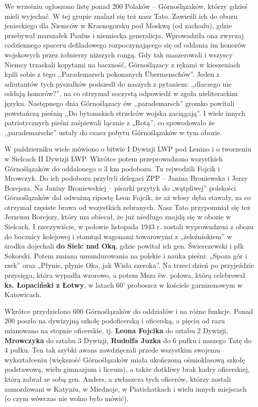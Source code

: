 We wrześniu ogłoszono listę ponad 200 Polaków -- Górnoślązaków, którzy gdzieś mieli wyjechać. W tej grupie znalazł się też nasz Tato. Zawieźli ich do obozu jenieckiego dla Niemców w Krasnogorsku pod Moskwą (od zachodu), gdzie przebywał marszałek Paulus i  niemiecka generalicja. Wprowadziła ona zwyczaj codziennego spaceru defiladowego rozpoczynającego się od oddania im honorów wojskowych przez żołnierzy niższych rangą. Gdy tak maszerowali i wszyscy Niemcy trzaskali kopytami na baczność, Górnoślązacy z rękami w kieszeniach kpili sobie z tego ,,Parademarsch pokonanych Übermenschów''. Jeden z adiutantów tych pyszałków podszedł do naszych z pytaniem: ,,dlaczego nie oddają honorów?'', na co otrzymał soczystą odpowiedź w zgoła nieliterackim języku. Następnego dnia Górnoślązacy ów ,,parademarsch'' gromko powitali powstańczą pieśnią ,,Do bytomskich strzelców wojska zaciągają''. I wiele innych patriotycznych pieśni zaśpiewali łącznie z „Rotą”, co spowodowało że ,,parademarsche'' ustały do czasu pobytu Górnoślązaków w tym obozie. 

W październiku wiele mówiono o bitwie I Dywizji LWP pod Lenino i o tworzeniu w Sielcach II Dywizji LWP. Wkrótce potem przeprowadzono wszystkich Górnoślązaków do oddalonego o 3 km podobozu. Tu rejwodzili Fojcik i Mrowczyk. Do ich podobozu przybyli delegaci ZPP -- Janina Broniewska i Jerzy Borejsza. Na Janiny Broniewskiej -- pisarki przytyk do „wątpliwej” polskości Górnoślązaków dał odważną ripostę Leon Fojcik, że aż włosy dęba stawały, za co otrzymał rzęsiste brawa od wszystkich zebranych. Nasz Tato przypomniał się też Jerzemu Borejszy, który mu obiecał, że już niedługo znajdą się w obozie w Sielcach. I rzeczywiście, w połowie listopada 1943 r. zostali wyprowadzeni z obozu do bocznicy kolejowej i stamtąd wagonami towarowymi z „żeleźniokiem” w środku dojechali \textbf{do Sielc nad Oką}, gdzie powitał ich gen. Świerczewski i płk Sokorski. Potem zmiana umundurowania na polskie i nauka pieśni: „Spoza gór i rzek” oraz „Płynie, płynie Oka, jak Wisła szeroka”. Na trzeci dzień po przyjeździe przysięga, która wypadła wzorowo, a potem Msza św. polowa, którą celebrował \textbf{ks. Łopaciński z Łotwy}, w latach 60’ proboszcz w kościele garnizonowym w Katowicach.

Wkrótce przydzielono 600 Górnoślązaków do oddziałów i na różne funkcje. Ponad 200 poszło na dywizyjną szkołę podoficerską i oficerską, a pięciu od razu mianowano na stopnie oficerskie, tj. \textbf{Leona Fojcika} do sztabu 2 Dywizji, \textbf{Mrowczyka} do sztabu 3 Dywizji, \textbf{Rudolfa Juzka} do 6 pułku i naszego Tatę do 4 pułku. Ten tak szybki awans zawdzięczali przede wszystkim swojemu wykształceniu (większość Górnoślązaków miała ukończoną ośmioklasową szkołę podstawową, wielu gimnazjum i liceum), a także dotkliwy brak kadry oficerskiej, którą zabrał ze sobą gen. Anders, a zwłaszcza tych oficerów, którzy zostali zamordowani w Katyniu, w Miednoje, w Piatichatkach i wielu innych miejscach (o czym wówczas nie wolno było mówić).

